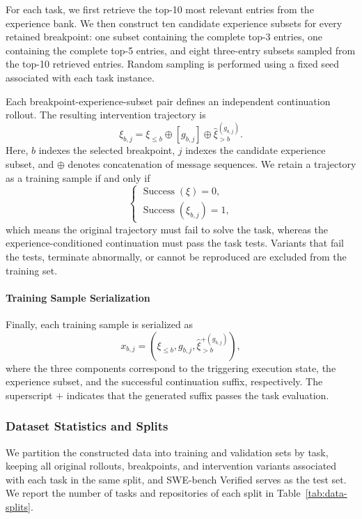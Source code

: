 For each task, we first retrieve the top-10 most relevant entries from the experience bank. We then construct ten candidate experience subsets for every retained breakpoint: one subset containing the complete top-3 entries, one containing the complete top-5 entries, and eight three-entry subsets sampled from the top-10 retrieved entries. Random sampling is performed using a fixed seed associated with each task instance.

Each breakpoint-experience-subset pair defines an independent continuation rollout. The resulting intervention trajectory is
\[
    \xi_{b,j}
    =
    \xi_{\leq b}
    \oplus
    [g_{b,j}]
    \oplus
    \hat{\xi}_{>b}^{(g_{b,j})}.
\]
Here, $b$ indexes the selected breakpoint, $j$ indexes the candidate experience subset, and \(\oplus\) denotes concatenation of message sequences. We retain a trajectory as a training sample if and only if
\[
    \begin{cases}
        \operatorname{Success}(\xi) = 0, \\
        \operatorname{Success}(\xi_{b,j}) = 1,
    \end{cases}
\]
which means the original trajectory must fail to solve the task, whereas the experience-conditioned continuation must pass the task tests. Variants that fail the tests, terminate abnormally, or cannot be reproduced are excluded from the training set.

\paragraph{Training Sample Serialization}
\label{subsec:training-example-serialization}

Finally, each training sample is serialized as
\[
    x_{b,j}
    =
    \left(
        \xi_{\leq b},
        g_{b,j},
        \hat{\xi}_{>b}^{+\left(g_{b,j}\right)}
    \right),
\]
where the three components correspond to the triggering execution state, the experience subset, and the successful continuation suffix, respectively. The superscript \(+\) indicates that the generated suffix passes the task evaluation.


\subsubsection{Dataset Statistics and Splits}

We partition the constructed data into training and validation sets by
task, keeping all original rollouts, breakpoints, and intervention
variants associated with each task in the same split, and SWE-bench Verified
serves as the test set. We report the number of tasks and repositories of each split in Table~\ref{tab:data-splits}.

